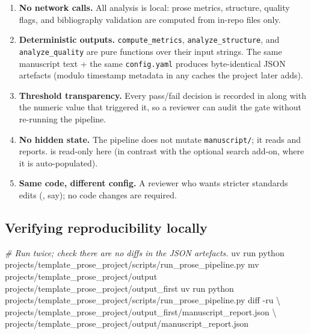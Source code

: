 \documentclass[
]{article}
\newenvironment{Shaded}{}{}
\newcommand{\AttributeTok}[1]{\textcolor[rgb]{0.49,0.56,0.16}{#1}}
\newcommand{\CommentTok}[1]{\textcolor[rgb]{0.38,0.63,0.69}{\textit{#1}}}
\newcommand{\DataTypeTok}[1]{\textcolor[rgb]{0.56,0.13,0.00}{#1}}
\newcommand{\ExtensionTok}[1]{#1}
\newcommand{\FunctionTok}[1]{\textcolor[rgb]{0.02,0.16,0.49}{#1}}
\newcommand{\NormalTok}[1]{#1}
\providecommand{\tightlist}{%
  \setlength{\itemsep}{0pt}\setlength{\parskip}{0pt}}
\begin{document}
\begin{enumerate}
\def\labelenumi{\arabic{enumi}.}
\tightlist
\item
  \textbf{No network calls.} All analysis is local: prose metrics,
  structure, quality flags, and bibliography validation are computed
  from in-repo files only.
\item
  \textbf{Deterministic outputs.} \texttt{compute\_metrics},
  \texttt{analyze\_structure}, and \texttt{analyze\_quality} are pure
  functions over their input strings. The same manuscript text + the
  same \texttt{config.yaml} produces byte-identical JSON artefacts
  (modulo timestamp metadata in any caches the project later adds).
\item
  \textbf{Threshold transparency.} Every pass/fail decision is recorded
  in  along with the numeric value that
  triggered it, so a reviewer can audit the gate without re-running the
  pipeline.
\item
  \textbf{No hidden state.} The pipeline does not mutate
  \texttt{manuscript/}; it reads and reports.
   is read-only here (in contrast with
  the optional search add-on, where it is auto-populated).
\item
  \textbf{Same code, different config.} A reviewer who wants stricter
  standards edits 
  (, say); no code
  changes are required.
\end{enumerate}

\subsection{Verifying reproducibility
locally}\label{verifying-reproducibility-locally}

\begin{Shaded}
\begin{Highlighting}[]
\CommentTok{\# Run twice; check there are no diffs in the JSON artefacts.}
\ExtensionTok{uv}\NormalTok{ run python projects/template\_prose\_project/scripts/run\_prose\_pipeline.py}
\FunctionTok{mv}\NormalTok{ projects/template\_prose\_project/output projects/template\_prose\_project/output\_first}
\ExtensionTok{uv}\NormalTok{ run python projects/template\_prose\_project/scripts/run\_prose\_pipeline.py}
\FunctionTok{diff} \AttributeTok{{-}ru} \DataTypeTok{\textbackslash{}}
\NormalTok{    projects/template\_prose\_project/output\_first/manuscript\_report.json }\DataTypeTok{\textbackslash{}}
\NormalTok{    projects/template\_prose\_project/output/manuscript\_report.json}
\end{Highlighting}
\end{Shaded}
\end{document}
